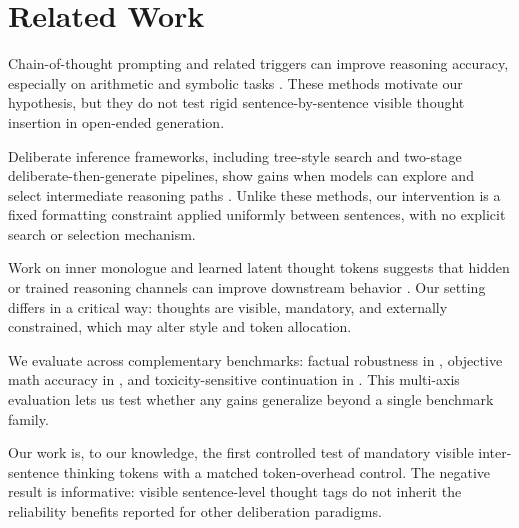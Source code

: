 \section{Related Work}
\label{sec:related}
 Chain-of-thought prompting and related triggers can improve reasoning accuracy, especially on arithmetic and symbolic tasks \citep{wei2022chain,kojima2022large,wang2022self}. These methods motivate our hypothesis, but they do not test rigid sentence-by-sentence visible thought insertion in open-ended generation.

 Deliberate inference frameworks, including tree-style search and two-stage deliberate-then-generate pipelines, show gains when models can explore and select intermediate reasoning paths \citep{yao2023tree,li2023deliberate}. Unlike these methods, our intervention is a fixed formatting constraint applied uniformly between sentences, with no explicit search or selection mechanism.

 Work on inner monologue and learned latent thought tokens suggests that hidden or trained reasoning channels can improve downstream behavior \citep{zhou2023think,zelikman2024quiet}. Our setting differs in a critical way: thoughts are visible, mandatory, and externally constrained, which may alter style and token allocation.

 We evaluate across complementary benchmarks: factual robustness in \truthfulqa \citep{lin2022truthfulqa}, objective math accuracy in \gsm \citep{cobbe2021training}, and toxicity-sensitive continuation in \rtp \citep{gehman2020realtoxicity}. This multi-axis evaluation lets us test whether any gains generalize beyond a single benchmark family.

 Our work is, to our knowledge, the first controlled test of mandatory visible inter-sentence thinking tokens with a matched token-overhead control. The negative result is informative: visible sentence-level thought tags do not inherit the reliability benefits reported for other deliberation paradigms.
